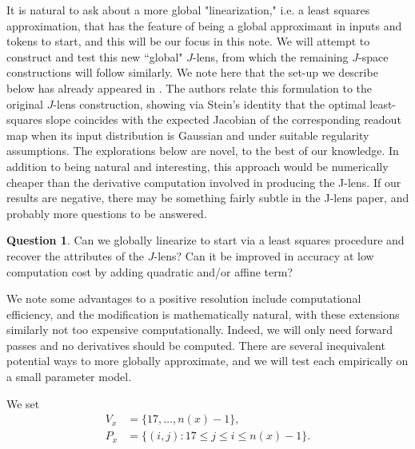 \documentclass[10pt,oneside,reqno]{amsart}
\theoremstyle{definition}
\newtheorem{question}[theorem]{Question}
\numberwithin{equation}{section}
\begin{document}
It is natural to ask about a more global "linearization," i.e. a least squares approximation, that has the feature of being a global approximant in inputs and tokens to start, and this will be our focus in this note. We will attempt to construct and test this new ``global" $J$-lens, from which the remaining $J$-space constructions will follow similarly. We note here that the set-up we describe below has already appeared in \cite{yan2026shorthorizons}. The authors relate this formulation to the original $J$-lens construction, showing via Stein's identity that the optimal least-squares slope coincides with the expected Jacobian of the corresponding readout map when its input distribution is Gaussian and under suitable regularity assumptions. The explorations below are novel, to the best of our knowledge. In addition to being natural and interesting, this approach would be numerically cheaper than the derivative computation involved in producing the J-lens. If our results are negative, there may be something fairly subtle in the J-lens paper, and probably more questions to be answered.





\begin{question}
Can we globally linearize to start via a least squares procedure and recover the attributes of the $J$-lens? Can it be improved in accuracy at low computation cost by adding quadratic and/or affine term? 
\end{question}

We note some advantages to a positive resolution include computational efficiency, and the modification is mathematically natural, with these extensions similarly not too expensive computationally. Indeed, we will only need forward passes and no derivatives should be computed. There are several inequivalent potential ways to more globally approximate, and we will test each empirically on a small parameter model. 


We set 
\begin{align*}
V_x &= \{17,\ldots,n(x)-1\},\\
P_x &= \{(i,j):17\le j\le i\le n(x)-1\}.
\end{align*}
\end{document}
